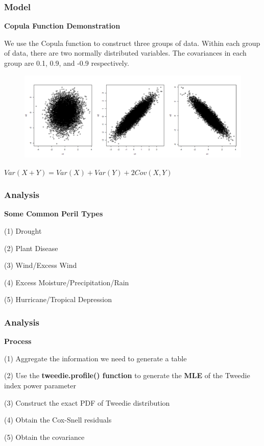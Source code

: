 \documentclass[serif,10pt,aspectratio=169]{beamer}
\begin{document}

\begin{frame}{}
\frametitle{Model}
\textbf{Copula Function Demonstration}
\par We use the Copula function to construct three groups of data. Within each group of data, there are two normally distributed variables. The covariances in each group are 0.1, 0.9, and -0.9 respectively.
\begin{figure}

\centering
\includegraphics[scale=0.3]{1111.png}

\label{fig:pathdemo1}
\end{figure}
\begin{center}
$Var(X+Y)=Var(X)+Var(Y)+2Cov(X, Y)$
\end{center}
\end{frame}

\begin{frame}
\frametitle{Analysis}
\textbf{Some Common Peril Types}

\par (1) Drought
\par (2) Plant Disease
\par (3) Wind/Excess Wind
\par (4) Excess Moisture/Precipitation/Rain
\par (5) Hurricane/Tropical Depression

\end{frame}

\begin{frame}
\frametitle{Analysis}
\textbf{Process}
\par 
\par (1) Aggregate the information we need to generate a table
\par (2) Use the \textbf{tweedie.profile() function} to generate the \textbf{MLE} of the Tweedie index power parameter
\par (3) Construct the exact PDF of Tweedie distribution
\par (4) Obtain the Cox-Snell residuals
\par (5) Obtain the covariance

\end{frame}
\end{document}
